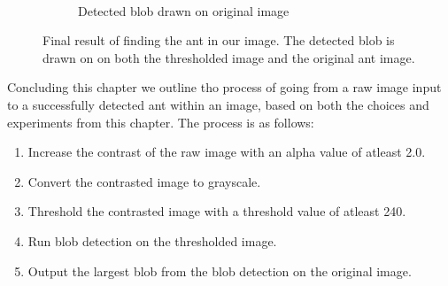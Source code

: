 \begin{figure}
\begin{subfigure}[b]{0.45\textwidth}
                \caption{\mbox{}\\Detected blob drawn on original image}
        \end{subfigure}
		\caption{Final result of finding the ant in our image. The detected blob is drawn on on both the thresholded image and the original ant image.}
		\label{fig:finalResult}
\end{figure}

Concluding this chapter we outline tho process of going from a raw image input to a successfully detected ant within an image, based on both the choices and experiments from this chapter. The process is as follows:

\begin{enumerate}
    \item Increase the contrast of the raw image with an alpha value of atleast 2.0.
    \item Convert the contrasted image to grayscale.
    \item Threshold the contrasted image with a threshold value of atleast 240.
    \item Run blob detection on the thresholded image.
    \item Output the largest blob from the blob detection on the original image.
\end{enumerate}